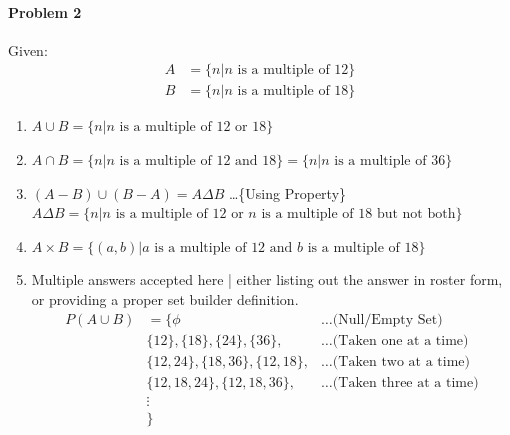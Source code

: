 \documentclass[12pt]{scrartcl}
\begin{document}
\paragraph*{Problem 2}
Given:
\begin{align*} 
     A &= \{n | n \text{ is a multiple of }12\} \\ 
     B &= \{n | n\text{ is a multiple of }18\}
\end{align*}
\begin{enumerate}
    \item $A \cup B = \{n | n\text{ is a multiple of }12 \text{ or }18\}$
    \item $A \cap B = \{n | n\text{ is a multiple of }12 \text{ and }18\} = \{n | n \text{ is a multiple of }36\}$
    \item $(A - B) \cup (B - A) = A \Delta B$ \hfill \ldots\{Using Property\} \\
    $A \Delta B = \{n | n\text{ is a multiple of }12 \text{ or $n$ is a multiple of }18 \text{ but not both}\}$
    \item $A \times B = \{(a, b) | a \text{ is a multiple of }12 \text{ and $b$ is a multiple of }18\}$
    \item Multiple answers accepted here | either listing out the answer in roster form, or providing a proper set builder definition. \\ 
    \begin{align*}
        P(A \cup B) &= \Big\{ \phi &\ldots \text{(Null/Empty Set)} \\
                    & \{12\}, \{18\}, \{24\}, \{36\}, & \ldots \text{(Taken one at a time)} \\
                    & \{12, 24\}, \{18, 36\}, \{12, 18\}, & \ldots \text{(Taken two at a time)} \\
                    & \{12, 18, 24 \}, \{12, 18, 36\}, &\ldots \text{(Taken three at a time)} \\
                    & \vdots & \\
                    & \Big\}
    \end{align*}    
\end{enumerate}
\end{document}
